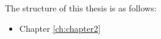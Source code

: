 The structure of this thesis is as follows:
\begin{itemize}
    \item Chapter \ref{ch:chapter2}
\end{itemize}